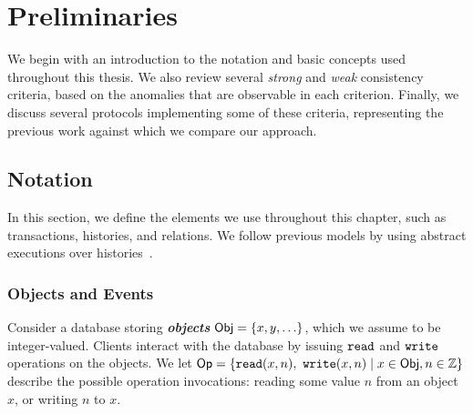 \cleardoublepage
\chapter{Preliminaries}







We begin with an introduction to the notation and basic concepts used throughout this thesis. We also review several \emph{strong} and \emph{weak} consistency criteria, based on the anomalies that are observable in each criterion. Finally, we discuss several protocols implementing some of these criteria, representing the previous work against which we compare our approach.

\section{Notation}

In this section, we define the elements we use throughout this chapter, such as transactions, histories, and relations. We follow previous models by using abstract executions over histories~\citep{concur_framework, adya_thesis}.


\subsection{Objects and Events}

Consider a database storing \textbf{\em objects} ${\sf Obj} = \{x, y, \ldots\}$, which we assume to be integer-valued. Clients interact with the database by issuing ${\tt read}$ and ${\tt write}$ operations on the objects. We let ${\sf Op} = \{{\tt read}(x, n),\ {\tt write}(x, n) \mid x \in {\sf Obj}, n \in \mathbb{Z} \}$ describe the possible operation invocations: reading some value $n$ from an object $x$, or writing $n$ to $x$.

